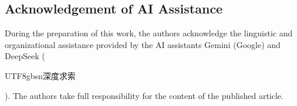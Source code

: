 \documentclass[10pt,reqno,letterpaper,twoside]{amsart}
\theoremstyle{article}
\begin{document}
  
 
 \subsection*{Acknowledgement of AI Assistance}
 During the preparation of this work,
 the authors acknowledge the linguistic and organizational assistance provided by the AI assistants Gemini (Google) and DeepSeek (\begin{CJK}{UTF8}{gbsn}深度求索\end{CJK}).
 The authors take full responsibility for the content of the published article.
  
  
\end{document}
